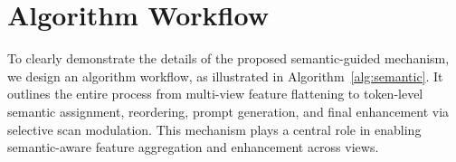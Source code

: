 \section{Algorithm Workflow}

To clearly demonstrate the details of the proposed semantic-guided mechanism, we design an algorithm workflow, as illustrated in Algorithm~\ref{alg:semantic}. It outlines the entire process from multi-view feature flattening to token-level semantic assignment, reordering, prompt generation, and final enhancement via selective scan modulation. This mechanism plays a central role in enabling semantic-aware feature aggregation and enhancement across views.











